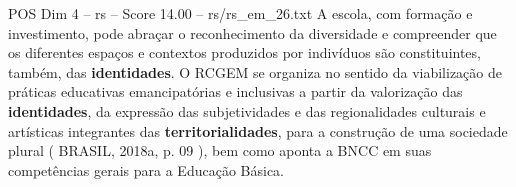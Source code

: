\begin{textsample}{POS Dim 4 – rs – Score 14.00 – rs/rs\_em\_26.txt}
A escola, com formação e investimento, pode abraçar o reconhecimento da diversidade e compreender que os diferentes espaços e contextos produzidos por indivíduos são constituintes, também, das \textbf{identidades}.
O RCGEM se organiza no sentido da viabilização de práticas educativas emancipatórias e inclusivas a partir da valorização das \textbf{identidades}, da expressão das subjetividades e das regionalidades culturais e artísticas integrantes das \textbf{territorialidades}, para a construção de uma sociedade plural ( BRASIL, 2018a, p. 09 ), bem como aponta a BNCC em suas competências gerais para a Educação Básica.

\end{textsample}
